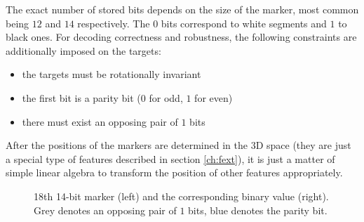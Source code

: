 The exact number of stored bits depends on the size of the marker, most common being $12$ and $14$ respectively.
The $0$ bits correspond to white segments and $1$ to black ones.
For decoding correctness and robustness, the following constraints are additionally imposed on the targets:

\begin{itemize}
	\item the targets must be rotationally invariant
	\item the first bit is a parity bit ($0$ for odd, $1$ for even)
	\item there must exist an opposing pair of $1$ bits
\end{itemize}

After the positions of the markers are determined in the 3D space (they are just a special type of features described in section \ref{ch:fext}), it is just a matter of simple linear algebra to transform the position of other features appropriately.

\begin{figure}[t]
	\centering
	
	\caption{18th 14-bit marker (left) and the corresponding binary value (right). Grey denotes an opposing pair of $1$ bits, blue denotes the parity bit.}
\end{figure}
